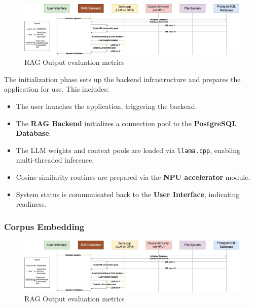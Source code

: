 {\begin{figure}[H]
    \centering
    \includegraphics[width=1.0\linewidth]{images/tldr-app-worklfow-pt1.jpg}
    \caption{RAG Output evaluation metrics ~\cite{cardenas2023rag}}
    \label{fig:autoregressive_decoding}
\end{figure}


The initialization phase sets up the backend infrastructure and prepares the application for use. This includes:

\begin{itemize}
    \item The user launches the application, triggering the backend.
    \item The \textbf{RAG Backend} initializes a connection pool to the \textbf{PostgreSQL Database}.
    \item The LLM weights and context pools are loaded via \texttt{llama.cpp}, enabling multi-threaded inference.
    \item Cosine similarity routines are prepared via the \textbf{NPU accelerator} module.
    \item System status is communicated back to the \textbf{User Interface}, indicating readiness.
\end{itemize}

\subsubsection{Corpus Embedding}

\begin{figure}[H]
    \centering
    \includegraphics[width=1.0\linewidth]{images/tldr-app-worklfow-pt1.jpg}
    \caption{RAG Output evaluation metrics ~\cite{cardenas2023rag}}
    \label{fig:autoregressive_decoding}
\end{figure}

}
